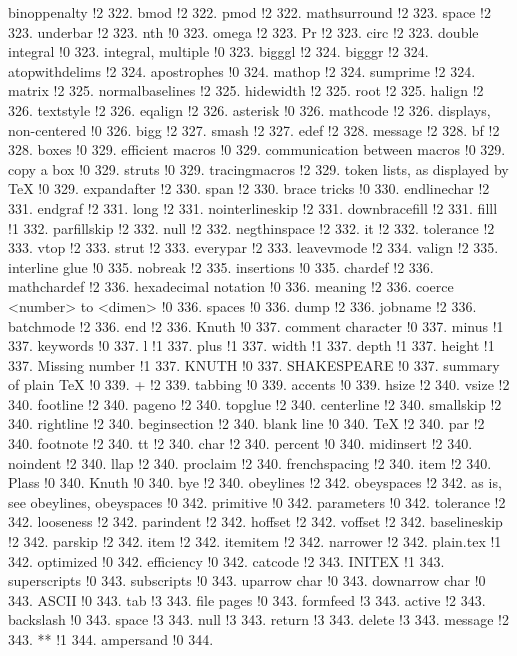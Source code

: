 binoppenalty !2 322.
bmod !2 322.
pmod !2 322.
mathsurround !2 323.
space !2 323.
underbar !2 323.
nth !0 323.
omega !2 323.
Pr !2 323.
circ !2 323.
double integral !0 323.
integral, multiple !0 323.
bigggl !2 324.
bigggr !2 324.
atopwithdelims !2 324.
apostrophes !0 324.
mathop !2 324.
sumprime !2 324.
matrix !2 325.
normalbaselines !2 325.
hidewidth !2 325.
root !2 325.
halign !2 326.
textstyle !2 326.
eqalign !2 326.
asterisk !0 326.
mathcode !2 326.
displays, non-centered !0 326.
bigg !2 327.
smash !2 327.
edef !2 328.
message !2 328.
bf !2 328.
boxes !0 329.
efficient macros !0 329.
communication between macros !0 329.
copy a box !0 329.
struts !0 329.
tracingmacros !2 329.
token lists, as displayed by TeX !0 329.
expandafter !2 330.
span !2 330.
brace tricks !0 330.
endlinechar !2 331.
endgraf !2 331.
long !2 331.
nointerlineskip !2 331.
downbracefill !2 331.
filll !1 332.
parfillskip !2 332.
null !2 332.
negthinspace !2 332.
it !2 332.
tolerance !2 333.
vtop !2 333.
strut !2 333.
everypar !2 333.
leavevmode !2 334.
valign !2 335.
interline glue !0 335.
nobreak !2 335.
insertions !0 335.
chardef !2 336.
mathchardef !2 336.
hexadecimal notation !0 336.
meaning !2 336.
coerce <number> to <dimen> !0 336.
spaces !0 336.
dump !2 336.
jobname !2 336.
batchmode !2 336.
end !2 336.
Knuth !0 337.
comment character !0 337.
minus !1 337.
keywords !0 337.
l !1 337.
plus !1 337.
width !1 337.
depth !1 337.
height !1 337.
Missing number !1 337.
KNUTH !0 337.
SHAKESPEARE !0 337.
summary of plain TeX !0 339.
+ !2 339.
tabbing !0 339.
accents !0 339.
hsize !2 340.
vsize !2 340.
footline !2 340.
pageno !2 340.
topglue !2 340.
centerline !2 340.
smallskip !2 340.
rightline !2 340.
beginsection !2 340.
blank line !0 340.
TeX !2 340.
par !2 340.
footnote !2 340.
tt !2 340.
char !2 340.
percent !0 340.
midinsert !2 340.
noindent !2 340.
llap !2 340.
proclaim !2 340.
frenchspacing !2 340.
item !2 340.
Plass !0 340.
Knuth !0 340.
bye !2 340.
obeylines !2 342.
obeyspaces !2 342.
as is, see obeylines, obeyspaces !0 342.
primitive !0 342.
parameters !0 342.
tolerance !2 342.
looseness !2 342.
parindent !2 342.
hoffset !2 342.
voffset !2 342.
baselineskip !2 342.
parskip !2 342.
item !2 342.
itemitem !2 342.
narrower !2 342.
plain.tex !1 342.
optimized !0 342.
efficiency !0 342.
catcode !2 343.
INITEX !1 343.
superscripts !0 343.
subscripts !0 343.
uparrow char !0 343.
downarrow char !0 343.
ASCII !0 343.
tab !3 343.
file pages !0 343.
formfeed !3 343.
active !2 343.
backslash !0 343.
space !3 343.
null !3 343.
return !3 343.
delete !3 343.
message !2 343.
** !1 344.
ampersand !0 344.
